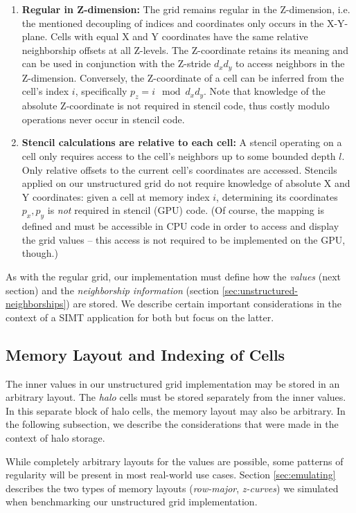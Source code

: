 \begin{enumerate}
    \item \textbf{Regular in Z-dimension:} The grid remains regular in the Z-dimension, i.e. the mentioned decoupling of indices and coordinates only occurs in the X-Y-plane. Cells with equal X and Y coordinates have the same relative neighborship offsets at all Z-levels. The Z-coordinate retains its meaning and can be used in conjunction with the Z-stride $d_xd_y$ to access neighbors in the Z-dimension. Conversely, the Z-coordinate of a cell can be inferred from the cell's index $i$, specifically $p_z = i \mod d_xd_y$. Note that knowledge of the absolute Z-coordinate is not required in stencil code, thus costly modulo operations never occur in stencil code.
    \item \textbf{Stencil calculations are relative to each cell:} A stencil operating on a cell only requires access to the cell's neighbors up to some bounded depth $l$. Only relative offsets to the current cell's coordinates are accessed. Stencils applied on our unstructured grid do not require knowledge of absolute X and Y coordinates: given a cell at memory index $i$, determining its coordinates $p_x, p_y$ is \emph{not} required in stencil (GPU) code. (Of course, the mapping is defined and must be accessible in CPU code in order to access and display the grid values -- this access is not required to be implemented on the GPU, though.) 
\end{enumerate}

As with the regular grid, our implementation must define how the \emph{values} (next section) and the \emph{neighborship information} (section \ref{sec:unstructured-neighborships}) are stored. We describe certain important considerations in the context of a SIMT application for both but focus on the latter.

\subsection{Memory Layout and Indexing of Cells} 
\label{sec:unstructured-indexing}

The inner values in our unstructured grid implementation may be stored in an arbitrary layout. The \emph{halo} cells must be stored separately from the inner values. In this separate block of halo cells, the memory layout may also be arbitrary. In the following subsection, we describe the considerations that were made in the context of halo storage.

While completely arbitrary layouts for the values are possible, some patterns of regularity will be present in most real-world use cases. Section \ref{sec:emulating} describes the two types of memory layouts (\emph{row-major}, \emph{z-curves}) we simulated when benchmarking our unstructured grid implementation.

